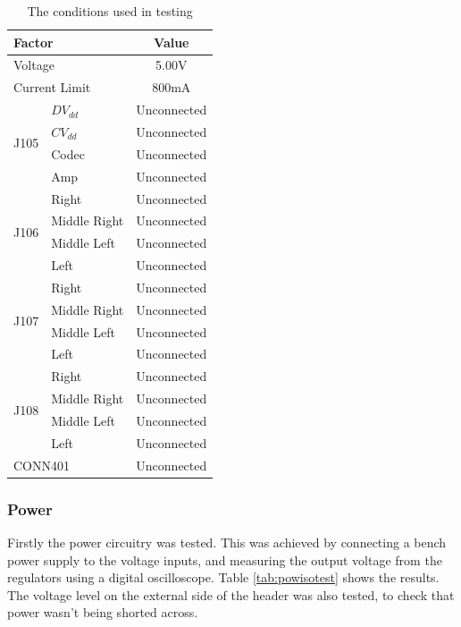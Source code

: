 \begin{table}[H]
	\centering
	\begin{tabular}[c]{| l | l | c |}
		\hline
		\multicolumn{2}{|l|}{Factor}		& Value	\\
		\hline
		\multicolumn{2}{|l|}{Voltage}		& 5.00V	\\
		\multicolumn{2}{|l|}{Current Limit}	& 800mA	\\
		\hline
		\multirow{4}{*}{J105}	& $DV_{dd}$	& Unconnected	\\
					& $CV_{dd}$	& Unconnected	\\
					& Codec		& Unconnected	\\
					& Amp		& Unconnected	\\
		\hline
		\multirow{4}{*}{J106}	& Right		& Unconnected	\\
					& Middle Right	& Unconnected	\\
					& Middle Left	& Unconnected	\\
					& Left		& Unconnected	\\
		\hline
		\multirow{4}{*}{J107}	& Right		& Unconnected	\\
					& Middle Right	& Unconnected	\\
					& Middle Left	& Unconnected	\\
					& Left		& Unconnected	\\
		\hline
		\multirow{4}{*}{J108}	& Right		& Unconnected	\\
					& Middle Right	& Unconnected	\\
					& Middle Left	& Unconnected	\\
					& Left		& Unconnected	\\
		\hline
		\multicolumn{2}{|l|}{CONN401}		& Unconnected	\\
		\hline
	\end{tabular}
	\caption{The conditions used in testing}
	\label{tab:testconditions}
\end{table}


\subsubsection{Power}
Firstly the power circuitry was tested.
This was achieved by connecting a bench power supply to the voltage inputs, and measuring the output voltage from the regulators using a digital oscilloscope.
Table \ref{tab:powisotest} shows the results.
The voltage level on the external side of the header was also tested, to check that power wasn't being shorted across.

